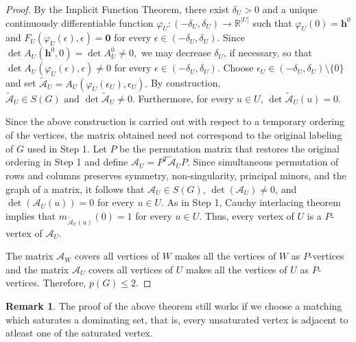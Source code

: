 \documentclass[12pt,reqno]{amsart}
\theoremstyle{plain}
\theoremstyle{definition}
\newtheorem{rem}{Remark}
\theoremstyle{block}
\theoremstyle{remark}
\numberwithin{equation}{section}
\begin{document}
\begin{proof}
By the Implicit Function Theorem, there exist \(\delta_U>0\) and a unique
continuously differentiable function
\(
\varphi_U:(-\delta_U,\delta_U)\longrightarrow\mathbb R^{|U|}
\)
such that
\(
\varphi_U(0)=\mathbf h^0
\)
and
\(
F_U(\varphi_U(\epsilon),\epsilon)=\mathbf 0
\)
for every \(\epsilon\in(-\delta_U,\delta_U)\).
Since
\(\det A_U(\mathbf h^0,0)=\det A_U^0\neq0,
\)
we may decrease \(\delta_U\), if necessary, so that
\(
\det A_U(\varphi_U(\epsilon),\epsilon)\neq0
\)
for every \(\epsilon\in(-\delta_U,\delta_U)\).
Choose
\(
\epsilon_U\in(-\delta_U,\delta_U)\setminus\{0\}
\)
and set
\(
\widetilde{\mathcal{A}}_U
=
A_U(\varphi_U(\epsilon_U),\epsilon_U).
\)
By construction,
\(
\widetilde{\mathcal{A}}_U\in S(G)
\text{ and }
\det\widetilde{\mathcal{A}}_U\neq0.
\)
Furthermore, for every \(u\in U\),
\(
\det\widetilde{\mathcal{A}}_U(u)=0.
\)

Since the above construction is carried out with respect to a temporary ordering of the vertices, the matrix obtained need not correspond to the original labeling of \(G\) used in Step 1. Let \(P\) be the permutation matrix that restores the original ordering in Step 1 and define
\(
\mathcal{A}_U=P^{T}\widetilde{\mathcal{A}}_U P.
\)
Since simultaneous permutation of rows and columns preserves symmetry, non-singularity, principal minors, and the graph of a matrix, it follows that \(\mathcal{A}_U\in S(G)\), \(\det(\mathcal{A}_U)\neq0\), and \(\det(\mathcal{A}_U(u))=0\) for every \(u\in U\).
As in Step 1, Cauchy interlacing theorem implies that
\(
m_{\widetilde{\mathcal{A}}_U(u)}(0)=1
\)
for every \(u\in U\). Thus, every vertex of \(U\) is a \(P\)-vertex
of \(\mathcal{A}_U\).

The matrix \(\mathcal A_W\) covers all vertices of \(W\) makes all the vertices of $W$ as $P$-vertices and the
matrix \(\mathcal A_U\) covers all vertices of \(U\) makes all the vertices of $U$ as $P$-vertices. Therefore,
\(
p(G)\leq2.
\) 

\end{proof}

\begin{rem}
    The proof of the above theorem still works if we choose a matching which saturates a dominating set, that is, every unsaturated vertex is adjacent to atleast one of the saturated vertex. 
\end{rem}


\end{document}
